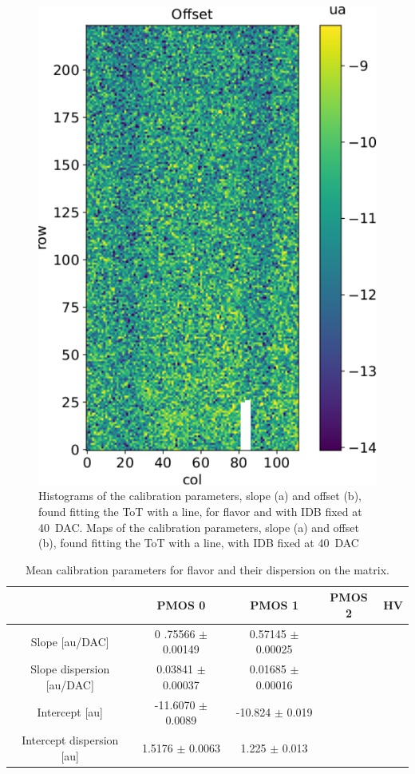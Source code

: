 \begin{figure}[h!]
            \includegraphics[width=.49\linewidth]{figures/charaterization/offset_map.pdf}
            \caption{Histograms of the calibration parameters, slope (a) and offset (b), found fitting the ToT with a line, for  flavor and with IDB fixed at \SI{40}{DAC}. Maps of the calibration parameters, slope (a) and offset (b), found fitting the ToT with a line, with IDB fixed at \SI{40}{DAC}}
            \label{fig:ToT_histograms_all_fl}
        \end{figure} 

        \begin{table}
            \begin{center}
            \begin{tabular}{| c |  c | c | c |c |}
            \hline
            & PMOS 0 & PMOS 1 & PMOS 2 & HV \\
            \hline
            \hline
            Slope [au/DAC] & 0 .75566 $\pm$ 0.00149 & 0.57145 $\pm$ 0.00025 \\
            Slope dispersion [au/DAC] & 0.03841 $\pm$ 0.00037 & 0.01685 $\pm$ 0.00016\\
            Intercept [au] & -11.6070 $\pm$ 0.0089 & -10.824 $\pm$ 0.019 \\
            Intercept dispersion [au] & 1.5176 $\pm$ 0.0063 & 1.225 $\pm$ 0.013\\
            \hline
            \end{tabular}
            \caption{Mean calibration parameters for  flavor and their dispersion on the matrix. }
            \label{tab:calibration_param}
            \end{center}
        \end{table}        

